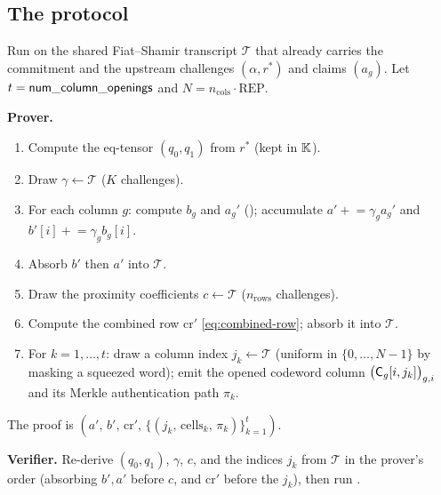 \subsection{The protocol}

\begin{protocol}
\label{prot:open}
Run on the shared Fiat--Shamir transcript $\mathcal{T}$ that already
carries the commitment and the upstream challenges $(\alpha, r^*)$ and
claims $(a_g)$. Let $t = \mathsf{num\_column\_openings}$ and
$N = n_{\mathrm{cols}}\cdot\mathrm{REP}$.

\smallskip
\noindent\textbf{Prover.}
\begin{enumerate}[leftmargin=2em]
  \item Compute the eq-tensor $(q_0, q_1)$ from $r^*$ (kept in $\mathbb{K}$).
  \item Draw $\gamma \leftarrow \mathcal{T}$ ($K$ challenges).
  \item For each column $g$: compute $b_g$ and $a_g'$
    (); accumulate $a' \mathrel{+}= \gamma_g a_g'$ and
    $b'[i]\mathrel{+}= \gamma_g b_g[i]$.
  \item Absorb $b'$ then $a'$ into $\mathcal{T}$.
  \item Draw the proximity coefficients $c \leftarrow \mathcal{T}$
    ($n_{\mathrm{rows}}$ challenges).
  \item Compute the combined row $\mathrm{cr}'$ \eqref{eq:combined-row};
    absorb it into $\mathcal{T}$.
  \item For $k = 1,\dots,t$: draw a column index $j_k \leftarrow
    \mathcal{T}$ (uniform in $\{0,\dots,N-1\}$ by masking a squeezed
    word); emit the opened codeword column $\bigl(\mathsf{C}_g[i,j_k]\bigr)_{g,i}$
    and its Merkle authentication path $\pi_k$.
  \end{enumerate}
The proof is $(a',\, b',\, \mathrm{cr}',\, \{(j_k,\,\text{cells}_k,\,\pi_k)\}_{k=1}^t)$.

\smallskip
\noindent\textbf{Verifier.}
Re-derive $(q_0,q_1)$, $\gamma$, $c$, and the indices $j_k$ from
$\mathcal{T}$ in the prover's order (absorbing $b',a'$ before $c$, and
$\mathrm{cr}'$ before the $j_k$), then run .
\end{protocol}

